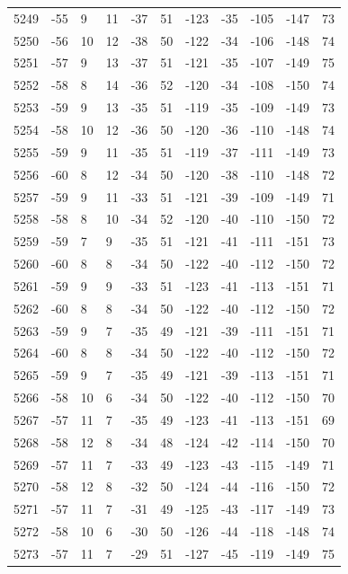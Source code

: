 \begin{table}[H]
\begin{tabular}{lllllllllll}
5249 & -55 & 9 & 11 & -37 & 51 & -123 & -35 & -105 & -147 & 73 \\
5250 & -56 & 10 & 12 & -38 & 50 & -122 & -34 & -106 & -148 & 74 \\
5251 & -57 & 9 & 13 & -37 & 51 & -121 & -35 & -107 & -149 & 75 \\
5252 & -58 & 8 & 14 & -36 & 52 & -120 & -34 & -108 & -150 & 74 \\
5253 & -59 & 9 & 13 & -35 & 51 & -119 & -35 & -109 & -149 & 73 \\
5254 & -58 & 10 & 12 & -36 & 50 & -120 & -36 & -110 & -148 & 74 \\
5255 & -59 & 9 & 11 & -35 & 51 & -119 & -37 & -111 & -149 & 73 \\
5256 & -60 & 8 & 12 & -34 & 50 & -120 & -38 & -110 & -148 & 72 \\
5257 & -59 & 9 & 11 & -33 & 51 & -121 & -39 & -109 & -149 & 71 \\
5258 & -58 & 8 & 10 & -34 & 52 & -120 & -40 & -110 & -150 & 72 \\
5259 & -59 & 7 & 9 & -35 & 51 & -121 & -41 & -111 & -151 & 73 \\
5260 & -60 & 8 & 8 & -34 & 50 & -122 & -40 & -112 & -150 & 72 \\
5261 & -59 & 9 & 9 & -33 & 51 & -123 & -41 & -113 & -151 & 71 \\
5262 & -60 & 8 & 8 & -34 & 50 & -122 & -40 & -112 & -150 & 72 \\
5263 & -59 & 9 & 7 & -35 & 49 & -121 & -39 & -111 & -151 & 71 \\
5264 & -60 & 8 & 8 & -34 & 50 & -122 & -40 & -112 & -150 & 72 \\
5265 & -59 & 9 & 7 & -35 & 49 & -121 & -39 & -113 & -151 & 71 \\
5266 & -58 & 10 & 6 & -34 & 50 & -122 & -40 & -112 & -150 & 70 \\
5267 & -57 & 11 & 7 & -35 & 49 & -123 & -41 & -113 & -151 & 69 \\
5268 & -58 & 12 & 8 & -34 & 48 & -124 & -42 & -114 & -150 & 70 \\
5269 & -57 & 11 & 7 & -33 & 49 & -123 & -43 & -115 & -149 & 71 \\
5270 & -58 & 12 & 8 & -32 & 50 & -124 & -44 & -116 & -150 & 72 \\
5271 & -57 & 11 & 7 & -31 & 49 & -125 & -43 & -117 & -149 & 73 \\
5272 & -58 & 10 & 6 & -30 & 50 & -126 & -44 & -118 & -148 & 74 \\
5273 & -57 & 11 & 7 & -29 & 51 & -127 & -45 & -119 & -149 & 75 \\

\end{tabular}
\end{table}
